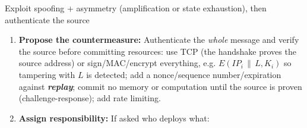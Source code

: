 \documentclass[12pt, a4paper]{article}
\newcommand{\term}[1]{\textbf{\textit{#1}}}        %
\newcommand{\imp}[1]{\hl{#1}}                       %
\begin{document}
\begin{schemebox}{Exploit spoofing + asymmetry (amplification or state exhaustion), then authenticate the source}
\begin{enumerate}[label=\textbf{Step \arabic*:}, leftmargin=*]
    \item \textbf{Propose the countermeasure:} Authenticate the \emph{whole} message and verify the source before committing resources: use TCP (the handshake proves the source address) or sign/MAC/encrypt everything, e.g. $E(IP_i \,\|\, L, K_i)$ so tampering with $L$ is detected; add a nonce/sequence number/expiration against \term{replay}; commit no memory or computation until the source is proven (challenge-response); add rate limiting.
    \item \textbf{Assign responsibility:} If asked who deploys what: 
\end{enumerate}
\end{schemebox}
\end{document}
